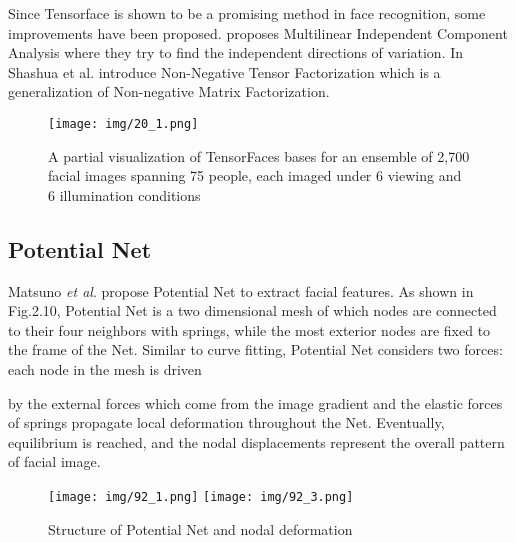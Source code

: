 \documentclass[12pt, twoside]{report}
\begin{document}
	\newpage

	\par
	Since Tensorface is shown to be a promising method in face recognition, some improvements have been proposed. \cite{92} proposes Multilinear Independent Component Analysis where they try to find the independent directions of variation. In \cite{76} Shashua et al. introduce Non-Negative Tensor Factorization which is a generalization of Non-negative Matrix Factorization.
	\par 
	\begin{figure}
	\texttt{[image: img/20\_1.png]}
	\caption{A partial visualization of TensorFaces bases for an ensemble of 2,700 facial images spanning 75 people, each imaged under 6 viewing and 6 illumination conditions \cite{92}}
	\label{Fig 2.9}
	\end{figure}
	\subsection{Potential Net}
	\par 
	Matsuno \textit{et al}. \cite{61} \cite{41} propose Potential Net to extract facial features. As shown in Fig.2.10, Potential Net is a two dimensional mesh of which nodes are connected to their four neighbors with springs, while the most exterior nodes are fixed to the frame of the Net. Similar to curve fitting, Potential Net considers two forces: each node in the mesh is driven

	\newpage
	by the external forces which come from the image gradient and the elastic forces of springs
propagate local deformation throughout the Net. Eventually, equilibrium is reached, and
the nodal displacements represent the overall pattern of facial image.
	\begin{figure}
		\begin{center}
			\texttt{[image: img/92\_1.png]}
			\texttt{[image: img/92\_3.png]}		
		\end{center}
		\caption{Structure of Potential Net and nodal deformation
		\cite{61}}
		\label{Fig 2.10}
	\end{figure}
\end{document}
